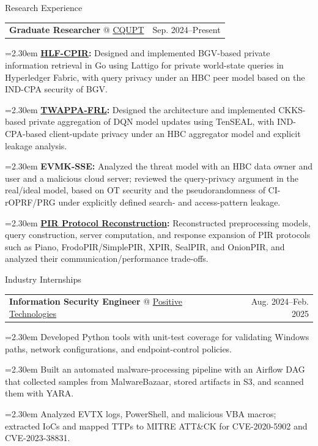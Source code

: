 \documentclass[11pt,a4paper]{article}
\makeatletter
\newcommand{\cvrow}[2]{%
  \noindent
  \begin{minipage}[t]{0.145\textwidth}
    \vspace{0pt}%
    \raggedright
    \fontsize{10.5}{12.5}\selectfont
    #1
  \end{minipage}%
  \hfill
  \begin{minipage}[t]{0.835\textwidth}
    \vspace{0pt}%
    #2
  \end{minipage}\par
}
\newcommand{\workentry}[2]{%
  \noindent
  \begin{tabularx}{\linewidth}
    {@{}X@{\hspace{0.8em}}r@{}}
    #1 & \small #2
  \end{tabularx}\par
  \vspace{0.15em}
}
\newcommand{\workproject}[1]{%
  \noindent
  \hangindent=2.30em
  \hangafter=1
  \hspace*{1.15em}\makebox[1.15em][l]{$\diamond$}#1\par
  \vspace{0.12em}
}
\makeatother
\begin{document}
\cvrow{Research Experience}{%
  \workentry
    {\textbf{Graduate Researcher} @
    \href{https://www.cqupt.edu.cn/}{CQUPT}}
    {Sep. 2024--Present}

  \workproject{\textbf{\href{https://github.com/iasenovets/2_2_HLF_CPIR}{HLF-CPIR}:}
  Designed and implemented BGV-based private information retrieval in Go using
  Lattigo for private world-state queries in Hyperledger Fabric,
  with query privacy under an HBC peer model based on the IND-CPA security of BGV.}

  \workproject{\textbf{\href{https://github.com/hetiantian10/TWAPPA-FRL}{TWAPPA-FRL}:}
  Designed the architecture and implemented CKKS-based
  private aggregation of DQN model updates using TenSEAL, with IND-CPA-based
  client-update privacy under an HBC aggregator model and explicit leakage analysis.}

  \workproject{\textbf{EVMK-SSE:} Analyzed the threat model with an HBC data owner
  and user and a malicious cloud server; reviewed the query-privacy argument in the
  real/ideal model, based on OT security and the pseudorandomness of CI-rOPRF/PRG under explicitly
  defined search- and access-pattern leakage.}



  \workproject{\textbf{\href{https://iasenovets.github.io/pir-schemes}{PIR Protocol Reconstruction}:}
  Reconstructed preprocessing
  models, query construction, server computation, and response expansion of PIR
  protocols such as Piano, FrodoPIR/SimplePIR, XPIR, SealPIR, and OnionPIR, and
  analyzed their communication/performance trade-offs.}
}

\vspace{0.50em}

\cvrow{Industry Internships}{%
  \workentry
    {\textbf{Information Security Engineer} @
    \href{https://global.ptsecurity.com/en/}{Positive Technologies}}
    {Aug. 2024--Feb. 2025}

  \workproject{Developed Python tools with unit-test coverage for validating
  Windows paths, network configurations, and endpoint-control policies.}
  \workproject{Built an automated malware-processing pipeline with an Airflow DAG
  that collected samples from MalwareBazaar, stored artifacts in S3, and scanned
  them with YARA.}
  \workproject{Analyzed EVTX logs, PowerShell, and malicious VBA macros; extracted
  IoCs and mapped TTPs to MITRE ATT\&CK for CVE-2020-5902 and CVE-2023-38831.}
}
\end{document}
